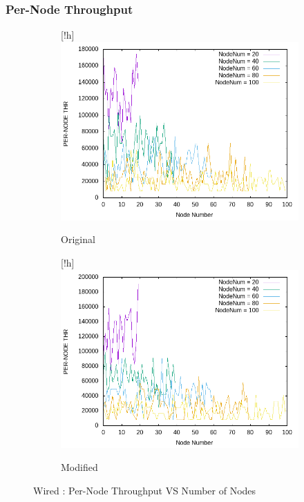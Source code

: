 \vspace{1cm}
    
\newpage
\subsubsection{Per-Node Throughput}
    
    \begin{figure}[!h]
    	\centering
    	
    	\begin{subfigure}{0.9\textwidth}[!h] %
    		\includegraphics[width=.95\textwidth]{Pictures/Wired/Original/PER-NODETHRVSNodeNum.png}
    		\caption{Original} %
    	\end{subfigure}
    	
    	\vspace{1em} %
    	
    	\begin{subfigure}{0.9\textwidth}[!h] %
    		\includegraphics[width=.95\textwidth]{Pictures/Wired/Modified/PER-NODETHRVSNodeNum.png}
    		\caption{Modified} %
    	\end{subfigure}
    	
    	\caption{Wired : Per-Node Throughput VS Number of Nodes} %
    \end{figure}
    
